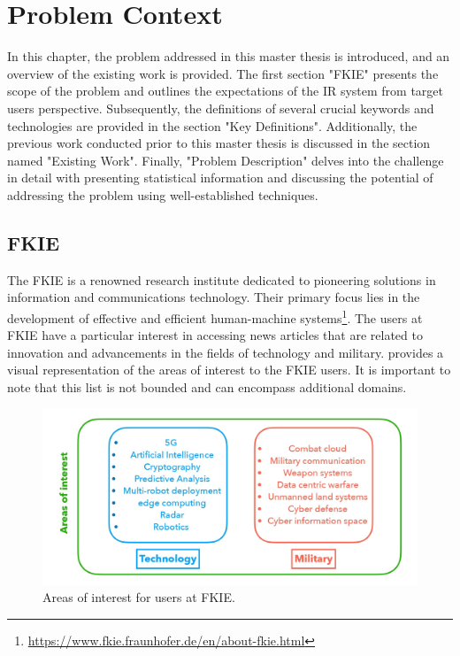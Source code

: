 
\chapter{Problem Context}

In this chapter, the problem addressed in this master thesis is introduced, and an overview of the existing work is provided. The first section "FKIE" presents the scope of the problem and outlines the expectations of the \ac{IR} system from target users perspective. Subsequently, the definitions of several crucial keywords and technologies are provided in the section "Key Definitions". Additionally, the previous work conducted prior to this master thesis is discussed in the section named "Existing Work". Finally, "Problem Description" delves into the challenge in detail with presenting statistical information and discussing the potential of addressing the problem using well-established techniques.

	\section{FKIE}

The \ac{FKIE} is a renowned research institute dedicated to pioneering solutions in information and communications technology. Their primary focus lies in the development of effective and efficient human-machine systems\footnote{\url{https://www.fkie.fraunhofer.de/en/about-fkie.html}}. The users at \ac{FKIE} have a particular interest in accessing news articles that are related to  innovation and advancements in the fields of technology and military.  provides a visual representation of the areas of interest to the \ac{FKIE} users. It is important to note that this list is not bounded and can encompass additional domains.

\begin{figure}[h]
	\centering
	\includegraphics[width=.8\textwidth]{images/keynotes_images/areas_of_interest.jpg}
	\caption{Areas of interest for users at FKIE. \label{fig:areas_of_interest}}
\end{figure} 

